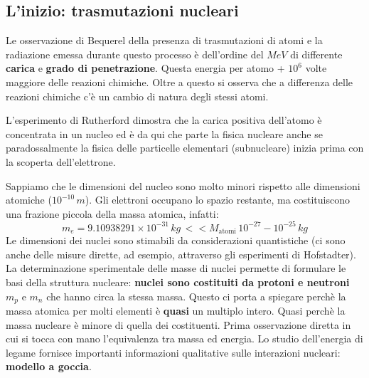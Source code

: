 \subsection{L'inizio: trasmutazioni nucleari}
Le osservazione di Bequerel della presenza di trasmutazioni di atomi e la radiazione emessa durante questo processo è dell'ordine del $MeV$ di differente \textbf{carica} e \textbf{grado di penetrazione}. Questa energia per atomo + $10^6$ volte maggiore delle reazioni chimiche. Oltre a questo si osserva che a differenza delle reazioni chimiche c'è un cambio di natura degli stessi atomi.

L'esperimento di Rutherford dimostra che la carica positiva dell'atomo è concentrata in un nucleo ed è da qui che parte la fisica nucleare anche se paradossalmente la fisica delle particelle elementari (subnucleare) inizia prima con la scoperta dell'elettrone.

Sappiamo che le dimensioni del nucleo sono molto minori rispetto alle dimensioni atomiche ($10^{-10}\,m$). Gli elettroni occupano lo spazio restante, ma costituiscono una frazione piccola della massa atomica, infatti:
\begin{equation*}
    m_e=9.10938291\times10^{-31}\,kg \,<<M_{\text{atomi}}\,10^{-27}-10^{-25}\,kg
\end{equation*}
Le dimensioni dei nuclei sono stimabili da considerazioni quantistiche (ci sono anche delle misure dirette, ad esempio, attraverso gli esperimenti di Hofstadter). La determinazione sperimentale delle masse di nuclei permette di formulare le basi della struttura nucleare: \textbf{nuclei sono costituiti da protoni e neutroni} $m_p$ e $m_n$ che hanno circa la stessa massa. Questo ci porta a spiegare perchè la massa atomica per molti elementi è \textbf{quasi} un multiplo intero. Quasi perchè la massa nucleare è minore di quella dei costituenti. Prima osservazione diretta in cui si tocca con mano l'equivalenza tra massa ed energia. Lo studio dell'energia di legame fornisce importanti informazioni qualitative sulle interazioni nucleari: \textbf{modello a goccia}.
